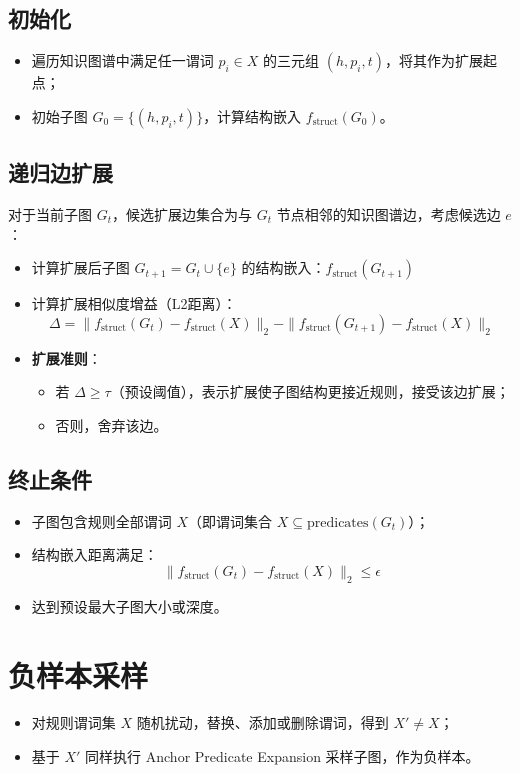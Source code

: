 \documentclass{article}
\begin{document}
\subsection{初始化}
\begin{itemize}
    \item 遍历知识图谱中满足任一谓词 $p_i \in X$ 的三元组 $(h, p_i, t)$，将其作为扩展起点；
    \item 初始子图 $G_0 = \{ (h, p_i, t) \}$，计算结构嵌入 $f_{\text{struct}}(G_0)$。
\end{itemize}

\subsection{递归边扩展}
对于当前子图 $G_t$，候选扩展边集合为与 $G_t$ 节点相邻的知识图谱边，考虑候选边 $e$：
\begin{itemize}
    \item 计算扩展后子图 $G_{t+1} = G_t \cup \{ e \}$ 的结构嵌入：$f_{\text{struct}}(G_{t+1})$
    \item 计算扩展相似度增益（L2距离）：
    $$\Delta = \| f_{\text{struct}}(G_t) - f_{\text{struct}}(X) \|_2 - \| f_{\text{struct}}(G_{t+1}) - f_{\text{struct}}(X) \|_2$$
    \item \textbf{扩展准则}：
    \begin{itemize}
        \item 若 $\Delta \geq \tau$（预设阈值），表示扩展使子图结构更接近规则，接受该边扩展；
        \item 否则，舍弃该边。
    \end{itemize}
\end{itemize}

\subsection{终止条件}
\begin{itemize}
    \item 子图包含规则全部谓词 $X$（即谓词集合 $X \subseteq \text{predicates}(G_t)$）；
    \item 结构嵌入距离满足：
    $$\| f_{\text{struct}}(G_t) - f_{\text{struct}}(X) \|_2 \leq \epsilon$$
    \item 达到预设最大子图大小或深度。
\end{itemize}

\section{负样本采样}
\begin{itemize}
    \item 对规则谓词集 $X$ 随机扰动，替换、添加或删除谓词，得到 $X' \neq X$；
    \item 基于 $X'$ 同样执行 Anchor Predicate Expansion 采样子图，作为负样本。
\end{itemize}
\end{document}

